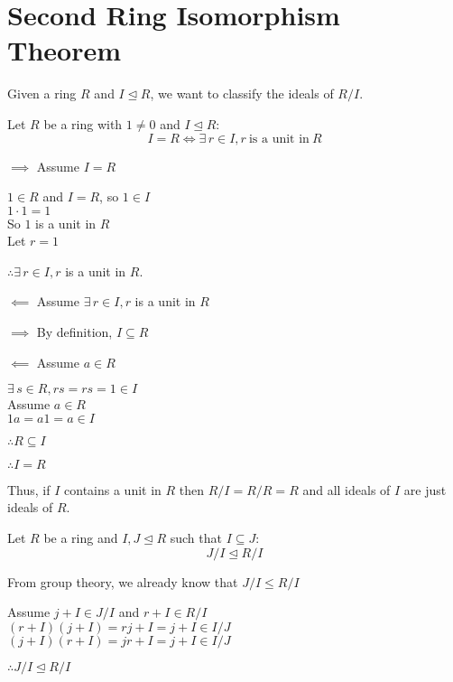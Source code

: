 \documentclass[letterpaper,12pt,fleqn]{article}
\newcommand{\ide}{\trianglelefteq}
\begin{document}
\section*{Second Ring Isomorphism Theorem}

Given a ring $R$ and $I\ide R$, we want to classify the ideals of $R/I$.

\begin{theorem}
  Let $R$ be a ring with $1\ne0$ and $I\ide R$:
  \[I=R \iff \exists\,r\in I,r\ \mbox{is a unit in}\ R\]
\end{theorem}

\begin{theproof}
  \listbreak
  \begin{description}
  \item $\implies$ Assume $I=R$

    $1\in R$ and $I=R$, so $1\in I$ \\
    $1\cdot1=1$ \\
    So $1$ is a unit in $R$ \\
    Let $r=1$

    $\therefore\exists\,r\in I,r$ is a unit in $R$.

  \item $\impliedby$ Assume $\exists\,r\in I,r$ is a unit in $R$

    \begin{description}
    \item $\implies$ By definition, $I\subseteq R$

    \item $\impliedby$ Assume $a\in R$

      $\exists\,s\in R,rs=rs=1\in I$ \\
      Assume $a\in R$ \\
      $1a=a1=a\in I$

      $\therefore R\subseteq I$
    \end{description}

    $\therefore I=R$
  \end{description}
\end{theproof}

Thus, if $I$ contains a unit in $R$ then $R/I=R/R=R$ and all ideals of $I$ are just
ideals of $R$.

\begin{theorem}
  Let $R$ be a ring and $I,J\ide R$ such that $I\subseteq J$:
  \[J/I\ide R/I\]
\end{theorem}

\begin{theproof}
  From group theory, we already know that $J/I\le R/I$

  Assume $j+I\in J/I$ and $r+I\in R/I$ \\
  $(r+I)(j+I)=rj+I=j+I\in I/J$ \\
  $(j+I)(r+I)=jr+I=j+I\in I/J$

  $\therefore J/I\ide R/I$
\end{theproof}
\end{document}
